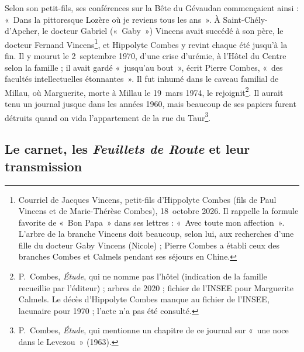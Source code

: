 Selon son petit-fils, ses conférences sur la Bête du Gévaudan commençaient ainsi : «~Dans la pittoresque Lozère où je reviens tous les ans~». À Saint-Chély-d'Apcher, le docteur Gabriel («~Gaby~»)\label{intro:gaby} Vincens avait succédé à son père, le docteur Fernand Vincens\footnote{Courriel de Jacques Vincens, petit-fils d'Hippolyte Combes (fils de Paul Vincens et de Marie-Thérèse Combes), 18~octobre 2026. Il rappelle la formule favorite de «~Bon Papa~»\label{intro:bon-papa} dans ses lettres : «~Avec toute mon affection~». L'arbre de la branche Vincens doit beaucoup, selon lui, aux recherches d'une fille du docteur Gaby Vincens (Nicole) ; Pierre Combes a établi ceux des branches Combes et Calmels pendant ses séjours en Chine.}, et Hippolyte Combes y revint chaque été jusqu'à la fin. Il y mourut le 2~septembre 1970, d'une crise d'urémie, à l'Hôtel du Centre selon la famille ; il avait gardé «~jusqu'au bout~», écrit Pierre Combes, «~des facultés intellectuelles étonnantes~». Il fut inhumé dans le caveau familial de Millau, où Marguerite, morte à Millau le 19~mars 1974, le rejoignit\footnote{P.~Combes, \textit{Étude}, qui ne nomme pas l'hôtel (indication de la famille recueillie par l'éditeur) ; arbres de 2020 ; fichier de l'INSEE pour Marguerite Calmels. Le décès d'Hippolyte Combes manque au fichier de l'INSEE, lacunaire pour 1970 ; l'acte n'a pas été consulté.}. Il aurait tenu un journal jusque dans les années 1960, mais beaucoup de ses papiers furent détruits quand on vida l'appartement de la rue du Taur\footnote{P.~Combes, \textit{Étude}, qui mentionne un chapitre de ce journal sur «~une noce dans le Levezou~» (1963).}.

\subsection{Le carnet, les \textit{Feuillets de Route} et leur transmission}\label{intro:transmission}

